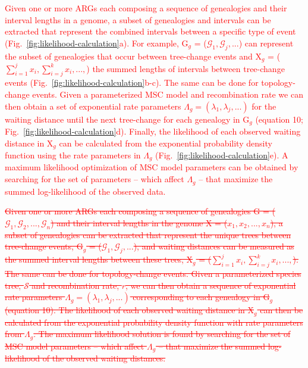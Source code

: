 \documentclass[11pt]{article}
\begin{document}
\textcolor{red}{
Given one or more ARGs each composing a sequence of genealogies and
their interval lengths in a genome, 
a subset of genealogies and intervals can be extracted that represent 
the combined intervals between a specific type of event
(Fig.~\ref{fig:likelihood-calculation}a).
For example, G$_g$ = ($\mathcal{G}_1, \mathcal{G}_j, ...$) can represent
the subset of genealogies that occur between tree-change events
and X$_g$ = ($\sum_{i=1}^j x_i, \sum_{i=j}^{k} x_i, ..., $) the summed
lengths of intervals between tree-change events
(Fig.~\ref{fig:likelihood-calculation}b-c).
The same can be done for topology-change events.
Given a parameterized MSC model and recombination rate
we can then obtain a set of exponential rate parameters
$\Lambda_g = (\lambda_1, \lambda_j, ...)$ for the waiting distance 
until the next tree-change for each genealogy in G$_g$ 
(equation 10; Fig.~\ref{fig:likelihood-calculation}d).
Finally, the likelihood of each observed waiting distance in X$_g$
can be calculated from the exponential probability density function 
using the rate parameters in $\Lambda_g$
(Fig.~\ref{fig:likelihood-calculation}e).
A maximum likelihood optimization of MSC model parameters can be obtained
by searching for the set of parameters -- which affect $\Lambda_g$ -- 
that maximize the summed log-likelihood of the observed data.
}

\textcolor{red}{
\sout{
Given one or more ARGs each composing a sequence of genealogies 
G = ($\mathcal{G}_1, \mathcal{G}_2, ..., \mathcal{G}_n$) and 
their interval lengths in the genome X = ($x_1, x_2, ..., x_n$),
a subset of genealogies can be extracted that represent the unique 
trees between tree-change events, 
G$_g$ = ($\mathcal{G}_1, \mathcal{G}_j, ...$), and 
waiting distances can be measured as the summed interval lengths between 
these trees, 
X$_g$ = ($\sum_{i=1}^j x_i, \sum_{i=j}^{k} x_i, ..., $).
The same can be done for topology-change events.
Given a parameterized species tree, $\mathcal{S}$ and recombination 
rate, $r$, we can then obtain a sequence of exponential rate parameters
$\Lambda_g = (\lambda_1, \lambda_j, ...)$ corresponding to each genealogy
in G$_g$ (equation 10).
The likelihood of each observed waiting distance in X$_g$
can then be calculated from the exponential probability density 
function with rate parameters from $\Lambda_g$. 
The maximum likelihood solution is found by searching for the
set of MSC model parameters -- which affect $\Lambda_g$ -- 
that maximize the summed log-likelihood of the observed waiting distances.
}}
\end{document}
